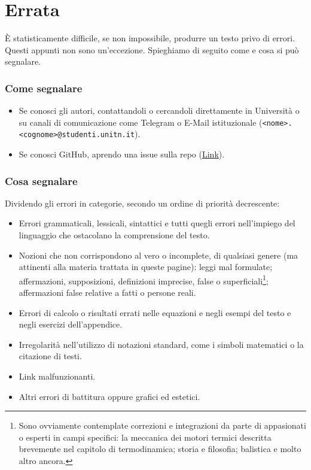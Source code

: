 \section*{Errata}
È statisticamente difficile, se non impossibile, produrre un testo
privo di errori. Questi appunti non sono un'eccezione.
Spieghiamo di seguito come e cosa si può segnalare.

\subsubsection*{Come segnalare}
\begin{itemize}
    \item Se conosci gli autori, contattandoli o cercandoli direttamente in Università
    o su canali di comunicazione come Telegram o E-Mail istituzionale
    (\texttt{<nome>.<cognome>@studenti.unitn.it}).

    \item Se conosci GitHub, aprendo una issue sulla repo (\href{https://github.com/zenosalty/courses-phy}{\faGithub \space Link}).

\end{itemize}

\subsubsection*{Cosa segnalare}
Dividendo gli errori in categorie, secondo un ordine di priorità
decrescente:

\begin{itemize}
    \item Errori grammaticali, lessicali, sintattici e tutti quegli errori nell'impiego
    del linguaggio che ostacolano la comprensione del testo.

    \item Nozioni che non corrispondono al vero o incomplete, di qualsiasi genere (ma
    attinenti alla materia trattata in queste pagine):
    leggi mal formulate; affermazioni, supposizioni, definizioni imprecise, false o
    superficiali\footnote{Sono ovviamente contemplate correzioni e integrazioni da parte di appasionati
    o esperti in campi specifici: la meccanica dei motori termici descritta brevemente
    nel capitolo di termodinamica; storia e filosofia; balistica e molto altro ancora.}; affermazioni false
    relative a fatti o persone reali.

    \item Errori di calcolo o risultati errati nelle equazioni e negli esempi del testo e negli
    esercizi dell'appendice.

    \item Irregolarità nell'utilizzo di notazioni standard, come i simboli matematici
    o la citazione di testi.

    \item Link malfunzionanti.
    
    \item Altri errori di battitura oppure grafici ed estetici.
\end{itemize}

